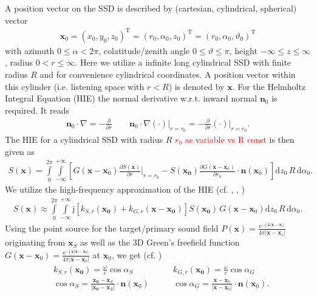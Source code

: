 \documentclass[a4paper,BCOR=15mm,10pt,twoside]{scrartcl}
\newcommand{\fscom}[2][red]{\textcolor{#1}{#2}}  %
\newcommand\e{\mathrm{e}}  %
\newcommand\im{\mathrm{j}}  %
\newcommand\fsd{\mathrm{d}}  %
\newcommand\wc{\frac{\omega}{c}}  %
\newcommand\jwc{\im\,\frac{\omega}{c}}  %
\newcommand\azx{\alpha}  %
\newcommand\elx{\vartheta}  %
\renewcommand{\vec}[1]{\mathbf{#1}}  %
\newcommand\unitn{\vec{n}}  %
\newcommand{\norm}[1]{|#1|}  %
\begin{document}
A position vector on the SSD is described by (cartesian, cylindrical, spherical) vector
\begin{align}
\vec{x}_0 = (x_0,y_0,z_0)^\mathrm{T} = (r_0,\azx_0, z_0)^\mathrm{T} = (r_0,\azx_0, \elx_0)^\mathrm{T}
\end{align}
with azimuth $0\leq \azx < 2\pi$, colatitude/zenith angle $0\leq \elx \leq \pi$, height $-\infty \leq z \leq \infty$, radius $0 < r \leq \infty$.
Here we utilize a infinite long cylindrical SSD with finite radius $R$ and for convenience cylindrical coordinates.
A position vector within this cylinder (i.e. listening space with $r<R$) is denoted by $\vec{x}$.
%
For the Helmholtz Integral Equation (HIE) the normal derivative w.r.t. inward normal $\unitn_0$ is required.
It reads
\begin{align}
\vec{n}_0 \cdot \nabla = -\frac{\partial}{\partial r} \qquad \vec{n}_0 \cdot \nabla(\cdot)\big|_{r=r_0} = -\frac{\partial}{\partial r}(\cdot)\bigg|_{r=r_0}.
\end{align}
%
The HIE for a cylindrical SSD with radius $R$ \fscom{$r_0$ as variable vs R const} is then given as
\begin{align}
S(\vec{x}) = \int\limits_{0}^{2\pi}\int\limits_{-\infty}^{+\infty}
\left[
G(\vec{x}-\vec{x}_0) \frac{\partial S(\vec{x})}{\partial r}\bigg|_{r=r_0} 
-S(\vec{x_0}) \frac{\partial G(\vec{x}-\vec{x}_0)}{\partial r_0}\cdot \unitn(\vec{x}_0)
\right]
\fsd z_0 \, R \, \fsd \azx_0.
\end{align}
%
We utilize the high-frequency approximation of the HIE (cf. \cite[(57),(58)]{Firtha2018}, \cite[(3.42)]{Firtha2018Diss}, \cite[(2.36)]{Schultz2016Diss})
\begin{align}
\label{eq:HIE_FAR1}
S(\vec{x}) \approx \int\limits_{0}^{2\pi}\int\limits_{-\infty}^{+\infty}
\im 
\left[
k_{S,r}(\vec{x_0}) + k_{G,r}(\vec{x} - \vec{x_0})
\right]
S(\vec{x_0})\,G(\vec{x}-\vec{x}_0)
\fsd z_0 \, R \, \fsd \azx_0.
\end{align}
%
Using the point source for the target/primary sound field $P(\vec{x}) = \frac{\e^{-\jwc |\vec{x}-\vec{x}_s|}}{4 \pi |\vec{x}-\vec{x}_s|}$ originating from $\vec{x}_S$ as well as the 3D Green's freefield function $G(\vec{x}-\vec{x}_0) = \frac{\e^{-\jwc |\vec{x}-\vec{x}_0|}}{4 \pi |\vec{x}-\vec{x}_0|}$ at $\vec{x}_0$, we get (cf. \cite[Sec. 2.2.1]{Schultz2016Diss})
\begin{align}
&k_{S,r}(\vec{x_0}) = \wc \cos\azx_S\qquad
&k_{G,r}(\vec{x_0}) = \wc \cos\azx_G\\
&\cos\azx_S = \frac{\vec{x_0}-\vec{x}_S}{|\vec{x_0}-\vec{x}_S|} \cdot \vec{n}(\vec{x}_0)\qquad
&\cos\azx_G = \frac{\vec{x}-\vec{x}_0}{\norm{\vec{x}-\vec{x}_0}} \cdot {\unitn(\vec{x}_0)}.
\end{align}
\end{document}
